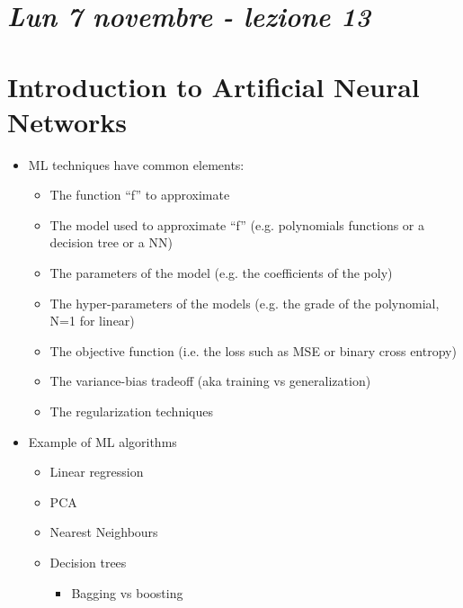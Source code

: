 


\section{\textit{Lun 7 novembre - lezione 13}}

\section{Introduction to Artificial Neural Networks}

\begin{tcolorbox}[width=\textwidth,colback={white},title={Recap lezione 1 },colbacktitle=cyan,coltitle=black]
	\begin{itemize}
		\item ML techniques have common elements:
		\begin{itemize}
			\item The function “f” to approximate
			\item The model used to approximate “f” (e.g. polynomials functions or a decision tree or a NN)
			\item The parameters of the model (e.g. the coefficients of the poly) 
			\item The hyper-parameters of the models (e.g. the grade of the polynomial, N=1 for linear)
			\item The objective function (i.e. the loss such as MSE or binary cross entropy)
			\item The variance-bias tradeoff (aka training vs generalization)
			\item The regularization techniques
		\end{itemize}
		\item Example of ML algorithms
		\begin{itemize}
			\item Linear regression
			\item PCA
			\item Nearest Neighbours
			\item Decision trees
			\begin{itemize}
				\item Bagging vs boosting
			\end{itemize}
		\end{itemize}
	\end{itemize} 
\end{tcolorbox}

